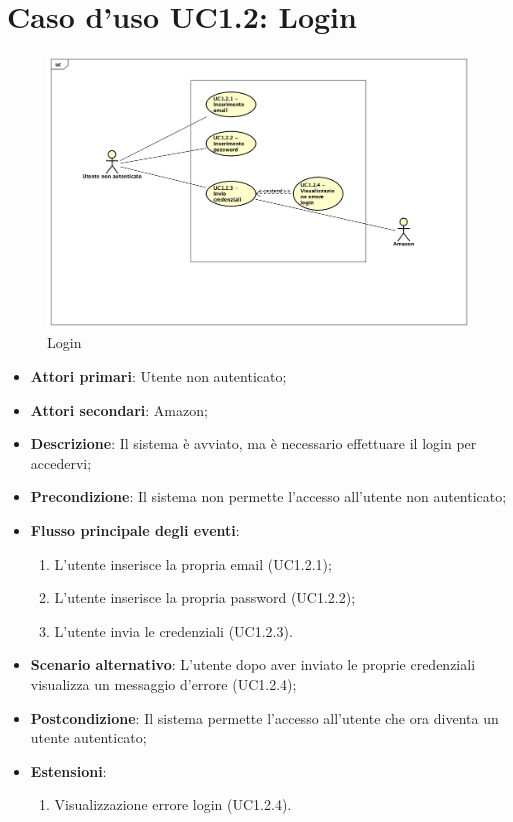 \section{Caso d'uso UC1.2: Login}
\begin{figure} [h]
	\centering
	\includegraphics[scale=0.4]{./Diagram/UC1-2.png}
	\caption{Login}\label{}
\end{figure}
\begin{itemize}
	\item \textbf{Attori primari}: Utente non autenticato;
	\item \textbf{Attori secondari}: Amazon;
	\item \textbf{Descrizione}: Il sistema è avviato, ma è necessario effettuare il login per accedervi;
	\item \textbf{Precondizione}: Il sistema non permette l'accesso all'utente non autenticato;
	\item \textbf{Flusso principale degli eventi}:
	\begin{enumerate}
		\item L'utente inserisce la propria email (UC1.2.1);
		\item L'utente inserisce la propria password (UC1.2.2);
		\item L'utente invia le credenziali (UC1.2.3).
	\end{enumerate}
	\item \textbf{Scenario alternativo}: L'utente dopo aver inviato le proprie credenziali visualizza un messaggio d'errore (UC1.2.4);
	\item \textbf{Postcondizione}: Il sistema permette l'accesso all'utente che ora diventa un utente autenticato; 
	\item \textbf{Estensioni}:
	\begin{enumerate}
		\item	Visualizzazione errore login (UC1.2.4).
	\end{enumerate}
\end{itemize}

